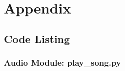 \newpage
\onecolumn
\section{Appendix}
\subsection{Code Listing}
\subsubsection{Audio Module: play\_song.py}
\inputminted{python}{../code/play_song.py}
